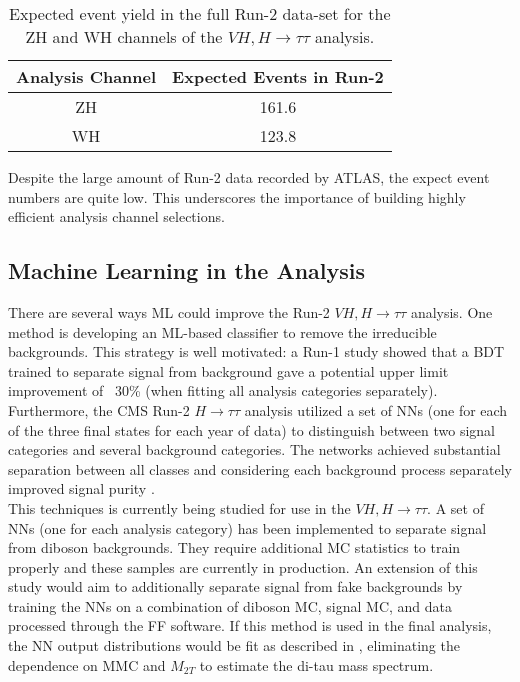 \begin{table}[htb!]
    \centering
    \begin{tabular}{|c|c|}
    \hline
        \textbf{Analysis Channel} & \textbf{Expected Events in Run-2} \\
        \hline
        ZH & 161.6\\
        WH & 123.8\\
        \hline
    \end{tabular}
    \caption{Expected event yield in the full Run-2 data-set for the ZH and WH channels of the $VH,H\rightarrow\tau\tau$ analysis.}
    \label{tab:exp_events}
\end{table}

Despite the large amount of Run-2 data recorded by ATLAS, the expect event numbers are quite low. This underscores the importance of building highly efficient analysis channel selections.

\subsection{Machine Learning in the Analysis}
There are several ways ML could improve the Run-2 $VH,H\rightarrow\tau\tau$ analysis. One method is developing an ML-based classifier to remove the irreducible backgrounds. This strategy is well motivated: a Run-1 study showed that a BDT trained to separate signal from background gave a potential upper limit improvement of ~30\% (when fitting all analysis categories separately). Furthermore, the CMS Run-2 $H\rightarrow\tau\tau$ analysis utilized a set of NNs (one for each of the three final states for each year of data) to distinguish between two signal categories and several background categories. The networks achieved substantial separation between all classes and considering each background process separately improved signal purity \cite{cms_htautau}.\\ 

This techniques is currently being studied for use in the $VH,H\rightarrow\tau\tau$. A set of NNs (one for each analysis category) has been implemented to separate signal from diboson backgrounds. They require additional MC statistics to train properly and these samples are currently in production. An extension of this study would aim to additionally separate signal from fake backgrounds by training the NNs on a combination of diboson MC, signal MC, and data processed through the FF software. If this method is used in the final analysis, the NN output distributions would be fit as described in \cite{cms_htautau}, eliminating the dependence on MMC and $M_{2T}$ to estimate the di-tau mass spectrum.\\

